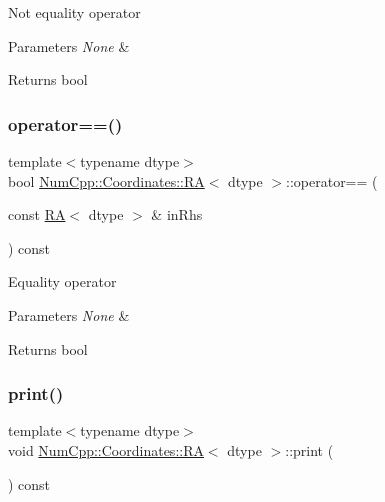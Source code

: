 Not equality operator


\begin{DoxyParams}{Parameters}
{\em None} & \\
\hline
\end{DoxyParams}
\begin{DoxyReturn}{Returns}
bool 
\end{DoxyReturn}
\mbox{\label{class_num_cpp_1_1_coordinates_1_1_r_a_a9bf19b8eb46f105b46db065be8d383ad}} 
\subsubsection{\texorpdfstring{operator==()}{operator==()}}
{\footnotesize\ttfamily template$<$typename dtype$>$ \\
bool \mbox{\hyperlink{class_num_cpp_1_1_coordinates_1_1_r_a}{Num\+Cpp\+::\+Coordinates\+::\+RA}}$<$ dtype $>$\+::operator== (\begin{DoxyParamCaption}\item[{const \mbox{\hyperlink{class_num_cpp_1_1_coordinates_1_1_r_a}{RA}}$<$ dtype $>$ \&}]{in\+Rhs }\end{DoxyParamCaption}) const\hspace{0.3cm}{\ttfamily [inline]}}

Equality operator


\begin{DoxyParams}{Parameters}
{\em None} & \\
\hline
\end{DoxyParams}
\begin{DoxyReturn}{Returns}
bool 
\end{DoxyReturn}
\mbox{\label{class_num_cpp_1_1_coordinates_1_1_r_a_ac118bac58f240612a3aa488ccb206d14}} 
\subsubsection{\texorpdfstring{print()}{print()}}
{\footnotesize\ttfamily template$<$typename dtype$>$ \\
void \mbox{\hyperlink{class_num_cpp_1_1_coordinates_1_1_r_a}{Num\+Cpp\+::\+Coordinates\+::\+RA}}$<$ dtype $>$\+::print (\begin{DoxyParamCaption}{ }\end{DoxyParamCaption}) const\hspace{0.3cm}{\ttfamily [inline]}}

